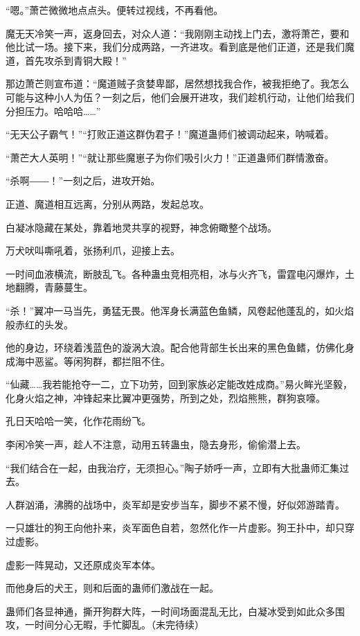 \begin{this_body}
“嗯。”萧芒微微地点点头。便转过视线，不再看他。

魔无天冷笑一声，返身回去，对众人道：“我刚刚主动找上门去，激将萧芒，要和他比试一场。接下来，我们分成两路，一齐进攻。看到底是他们正道，还是我们魔道，首先攻杀到青铜大殿！”

那边萧芒则宣布道：“魔道贼子贪婪卑鄙，居然想找我合作，被我拒绝了。我怎么可能与这种小人为伍？一刻之后，他们会展开进攻，我们趁机行动，让他们给我们分担压力。哈哈哈……”

“无天公子霸气！”“打败正道这群伪君子！”魔道蛊师们被调动起来，呐喊着。

“萧芒大人英明！”“就让那些魔崽子为你们吸引火力！”正道蛊师们群情激奋。

“杀啊――！”一刻之后，进攻开始。

正道、魔道相互远离，分别从两路，发起总攻。

白凝冰隐藏在某处，靠着地灵共享的视野，神念俯瞰整个战场。

万犬吠叫嘶吼着，张扬利爪，迎接上去。

一时间血液横流，断肢乱飞。各种蛊虫竞相亮相，冰与火齐飞，雷霆电闪爆炸，土地翻腾，青藤蔓生。

“杀！”翼冲一马当先，勇猛无畏。他浑身长满蓝色鱼鳞，风卷起他蓬乱的，如火焰般赤红的头发。

他的身边，环绕着浅蓝色的漩涡大浪。配合他背部生长出来的黑色鱼鳍，仿佛化身成海中恶鲨。等闲狗群，都拦阻不住。

“仙藏……我若能抢夺一二，立下功劳，回到家族必定能改姓成商。”易火眸光坚毅，化身火焰之神，冲锋起来比翼冲更强势，所到之处，烈焰熊熊，群狗哀嚎。

孔日天哈哈一笑，化作花雨纷飞。

李闲冷笑一声，趁人不注意，动用五转蛊虫，隐去身形，偷偷潜上去。

“我们结合在一起，由我治疗，无须担心。”陶子娇呼一声，立即有大批蛊师汇集过去。

人群汹涌，沸腾的战场中，炎军却是安步当车，脚步不紧不慢，好似郊游踏青。

一只雄壮的狗王向他扑来，炎军面色自若，忽然化作一片虚影。狗王扑中，却只穿过虚影。

虚影一阵晃动，又还原成炎军本体。

而他身后的犬王，则和后面的蛊师们激战在一起。

蛊师们各显神通，撕开狗群大阵，一时间场面混乱无比，白凝冰受到如此众多围攻，一时间分心无暇，手忙脚乱。（未完待续）

\end{this_body}

